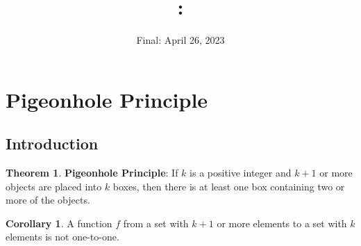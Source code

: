\documentclass[article, 12pt]{article}
\title{
    \vspace{2in}
    \textmd{\textbf{\courseNumber: \courseName}}
    \normalsize\vspace{0.1in}\\
    \vspace{0.1in}\large{\text{\professor}}
    \vspace{3in}
}
\author{\name}
\date{Final: April 26, 2023}
\theoremstyle{definition}
\newtheorem{theorem}{Theorem}[subsection]
\newtheorem{corollary}{Corollary}[subsection]
\begin{document}
    \maketitle
    \thispagestyle{empty}
    \pagebreak
    \tableofcontents
    \pagebreak

    \section{Pigeonhole Principle}
    \subsection{Introduction}
    \begin{theorem}
        \textbf{Pigeonhole Principle}: If $k$ is a positive integer and $k+1$ or more objects are placed into $k$ boxes, then there is at least one box containing two or more of the objects.
    \end{theorem}
    \begin{corollary}
        A function $f$ from a set with $k+1$ or more elements to a set with $k$ elements is not one-to-one.
    \end{corollary}
\end{document}
